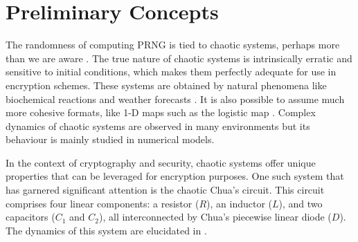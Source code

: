 \section{Preliminary Concepts}
The randomness of computing PRNG is tied to chaotic systems, perhaps more than we are aware \cite{Herring.1989}. The true nature of chaotic systems is intrinsically erratic and sensitive to initial conditions, which makes them perfectly adequate for use in encryption schemes.
These systems are obtained by natural phenomena like biochemical reactions \cite{Pu.2020} and weather forecasts \cite{Lin.2024}. It is also possible to assume much more cohesive formats, like 1-D maps such as the logistic map \cite{May.1976g0uk}. Complex dynamics of chaotic systems are observed in many environments but its behaviour is mainly studied in numerical models.

In the context of cryptography and security, chaotic systems offer unique properties that can be leveraged for encryption purposes. One such system that has garnered significant attention is the chaotic Chua's circuit. This circuit comprises four linear components: a resistor ($R$), an inductor ($L$), and two capacitors ($C_1$ and $C_2$), all interconnected by Chua's piecewise linear diode ($D$). The dynamics of this system are elucidated in \cite{Nardo.2019}.

